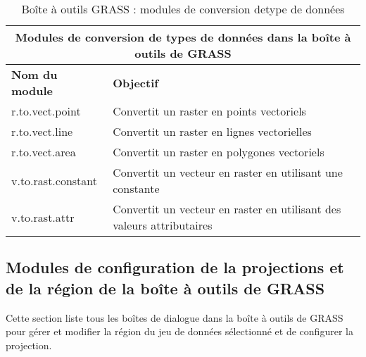 \begin{table}[H]
\centering
 \begin{tabular}{|p{4cm}|p{10cm}|}
  \hline \multicolumn{2}{|c|}{\textbf{Modules de conversion de types de données dans la boîte à outils de GRASS}} \\
    \hline \textbf{Nom du module} & \textbf{Objectif} \\
  \hline r.to.vect.point & Convertit un raster en points vectoriels \\
  \hline r.to.vect.line & Convertit un raster en lignes vectorielles \\
  \hline r.to.vect.area & Convertit un raster en polygones vectoriels \\
  \hline v.to.rast.constant & Convertit un vecteur en raster en utilisant une constante \\
  \hline v.to.rast.attr & Convertit un vecteur en raster en utilisant des valeurs attributaires\\
\hline
\end{tabular}
\caption{Boîte à outils GRASS : modules de conversion detype de données}
\end{table}

\subsection{Modules de configuration de la projections et de la région de la boîte à outils de GRASS }

Cette section liste tous les boîtes de dialogue dans la boîte à outils de GRASS pour gérer et modifier la région du jeu de données sélectionné et de configurer la projection.

